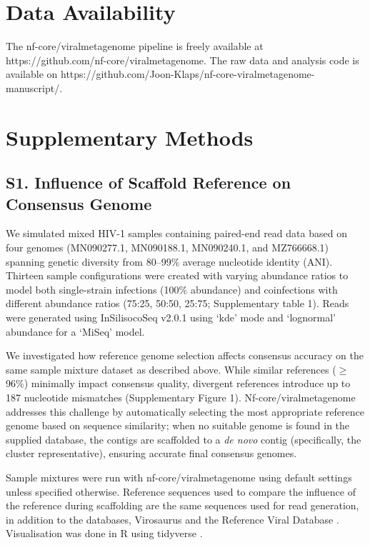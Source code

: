 
\section*{Data Availability}
The nf-core/viralmetagenome pipeline is freely available at https://github.com/nf-core/viralmetagenome.
The raw data and analysis code is available on https://github.com/Joon-Klaps/nf-core-viralmetagenome-manuscript/.

\section*{Supplementary Methods}
\subsection*{S1. Influence of Scaffold Reference on Consensus Genome}

We simulated mixed  HIV-1 samples containing paired-end read data based on four genomes (MN090277.1, MN090188.1, MN090240.1, and MZ766668.1) spanning genetic diversity from 80–99\% average nucleotide identity (ANI). Thirteen sample configurations were created with varying abundance ratios to model both single-strain infections (100\% abundance) and coinfections with different abundance ratios (75:25, 50:50, 25:75; Supplementary table 1). Reads were generated using InSilisocoSeq v2.0.1 \citep{Gourle2019-ox} using ‘kde’ mode and ‘lognormal’ abundance for a ‘MiSeq’ model.

We investigated how reference genome selection affects consensus accuracy on the same sample mixture dataset as described above. While similar references ($\geq$ 96\%) minimally impact consensus quality, divergent references introduce up to 187 nucleotide mismatches (Supplementary Figure 1). Nf-core/viralmetagenome addresses this challenge by automatically selecting the most appropriate reference genome based on sequence similarity; when no suitable genome is found in the supplied database, the contigs are scaffolded to a \textit{de novo} contig (specifically, the cluster representative), ensuring accurate final consensus genomes.

Sample mixtures were run with nf-core/viralmetagenome using default settings unless specified otherwise. Reference sequences used to compare the influence of the reference during scaffolding are the same sequences used for read generation, in addition to the databases, Virosaurus \citep{Gleizes2020-rq} and the Reference Viral Database \citep{Goodacre2018-dw}. Visualisation was done in R \citep{R_Core_Team2021-ow} using tidyverse \citep{Wickham2019-vr}.

